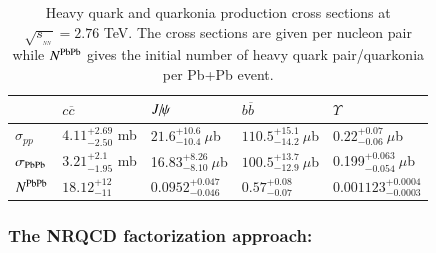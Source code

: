 \begin{table}
\caption[]{Heavy quark and quarkonia production  cross sections at
$\sqrt{s_{_{_{NN}}}}= 2.76$ TeV. The cross sections are given per nucleon pair while
$N^{\rm PbPb}$ gives the initial number of heavy quark pair/quarkonia per Pb+Pb event.}
\label{NLOcros}
\begin{tabular}{l|l|l|l|l} 
\hline 
\hline
             & $ c \overline c$            &$J\hspace{-.08em}/\hspace{-.14em}\psi$                      & $ b \overline b$                    & $\Upsilon$   \\              
\hline
$\sigma_{pp}$ & $4.11^{+2.69}_{-2.50}$ mb    & $21.6^{+10.6}_{-10.4}~\mu$b   & $110.5^{+15.1}_{-14.2}~\mu$b            & $0.22^{+0.07}_{-0.06}~\mu$b  \\


$\sigma_{\rm PbPb}$ & $3.21^{+2.1}_{-1.95}$ mb    &16.83$^{+8.26}_{-8.10}~\mu$b    & $100.5^{+13.7}_{-12.9}~\mu$b             & 0.199$^{+0.063}_{-0.054}~\mu$b  \\



$N^{\rm PbPb}$     & $18.12^{+12}_{-11}$       & $0.0952^{+0.047}_{-0.046}$         & $0.57^{+0.08}_{-0.07}$                          & $0.001123^{+0.0004}_{-0.0003}$       \\

\hline
\hline
\end{tabular}
\end{table}






\subsubsection{The NRQCD factorization approach:}


